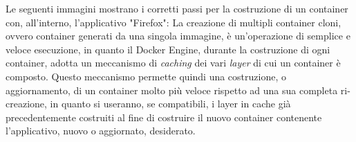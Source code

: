 Le seguenti immagini mostrano i corretti passi per la costruzione di un container con, all'interno, l'applicativo "Firefox":
La creazione di multipli container cloni, ovvero container generati da una singola immagine, è un'operazione di semplice e veloce esecuzione, in quanto il Docker Engine, durante la costruzione di ogni container, adotta un meccanismo di \textit{\gls{caching}} dei vari \textit{\gls{layer}} di cui un container è composto. Questo meccanismo permette quindi una costruzione, o aggiornamento, di un container molto più veloce rispetto ad una sua completa ri-creazione, in quanto si useranno, se compatibili, i layer in cache già precedentemente costruiti al fine di costruire il nuovo container contenente l'applicativo, nuovo o aggiornato, desiderato.



